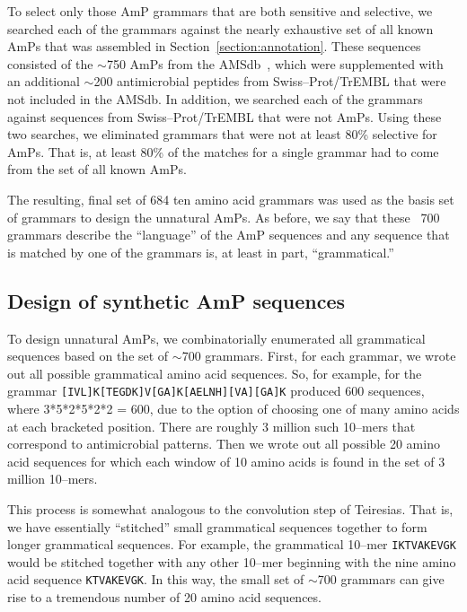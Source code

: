 To select only those AmP grammars that are both sensitive and
selective, we searched each of the grammars against the nearly
exhaustive set of all known AmPs that was assembled in
Section~\vref{section:annotation}. These sequences consisted of the
$\sim$750 AmPs from the AMSdb~\cite{tossi2002antimicrobial}, which
were supplemented with an additional $\sim$200 antimicrobial
peptides from Swiss--Prot/TrEMBL that were not included in the
AMSdb.  In addition, we searched each of the grammars against
sequences from Swiss--Prot/TrEMBL that were not AmPs.  Using these
two searches, we eliminated grammars that were not at least 80\%
selective for AmPs. That is, at least 80\% of the matches for a
single grammar had to come from the set of all known AmPs.

    The resulting, final set of 684 ten amino acid
    grammars was used as the basis set of grammars to design the unnatural AmPs.
    As before, we say that these ~700 grammars describe the ``language'' of
    the AmP sequences and any sequence that is matched by one of the
    grammars is, at least in part, ``grammatical.''


\subsection{Design of synthetic AmP sequences}

    To design unnatural AmPs, we combinatorially
    enumerated all grammatical sequences based on
    the set of $\sim$700 grammars.  First, for each grammar,
    we wrote out all possible grammatical amino
    acid sequences.  So, for example, for the grammar
    \texttt{[IVL]K[TEGDK]V[GA]K[AELNH][VA][GA]K} produced 600
    sequences, where 3*5*2*5*2*2 = 600, due to the
    option of choosing one of many amino acids at each
    bracketed position.  There are roughly 3 million
    such 10--mers that correspond to antimicrobial
    patterns.  Then we wrote out all possible 20 amino
    acid sequences for which each window of 10 amino
    acids is found in the set of 3 million 10--mers.

    This process is somewhat analogous to the convolution step of
    Teiresias.  That is, we have essentially ``stitched'' small
    grammatical sequences together to form longer grammatical
    sequences.  For example, the grammatical 10--mer
    \texttt{IKTVAKEVGK} would be stitched together with any other
    10--mer beginning with the nine amino acid sequence
    \texttt{KTVAKEVGK}.  In this way, the small set of $\sim$700
    grammars can give rise to a tremendous number of 20 amino
    acid sequences.

